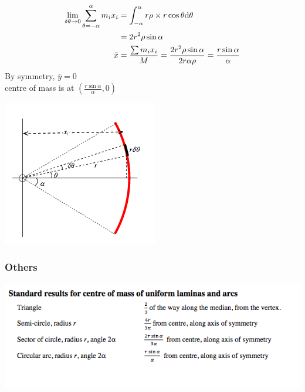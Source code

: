 \documentclass[a4paper]{article}
\begin{document}
\begin{align*}
    \lim_{\delta\theta\rightarrow0}\sum_{\theta=-\alpha}^{\alpha}m_ix_i&=\int_{-\alpha}^{\alpha}r\rho\times r \cos\theta\mathrm{d}\theta \\
    &= 2r^2\rho\sin\alpha \\
    \bar{x}&=\frac{\sum m_ix_i}{M}=\frac{2r^2\rho\sin\alpha}{2r\alpha\rho}=\frac{r\sin\alpha}{\alpha}
\end{align*}
By symmetry, $\bar{y}=0$\\
centre of mass is at $(\frac{r\sin\alpha}{\alpha},0)$
\begin{center}
    \includegraphics[scale=0.5]{img_M/14_intro2}
\end{center}

\subsubsection{Others}
\begin{center}
    \includegraphics[scale=0.5]{img_M/14_others}
\end{center}
\end{document}
